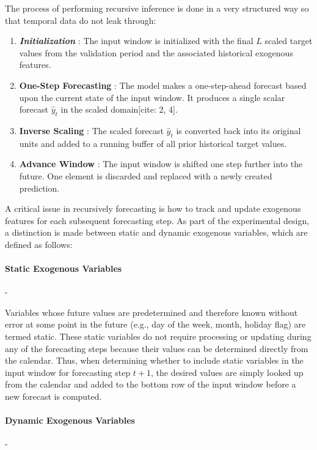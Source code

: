 The process of performing recursive inference is done in a very structured way so that temporal data do not leak through:
\begin{enumerate}
\item \textit{\textbf{Initialization}} : The input window is initialized with the final $L$ scaled target values from the validation period and the associated historical exogenous features.

\item \textbf{One-Step Forecasting} : The model makes a one-step-ahead forecast based upon the current state of the input window. It produces a single scalar forecast $\hat{y}_t$ in the scaled domain[cite: 2, 4].

\item \textbf{Inverse Scaling} : The scaled forecast $\hat{y}_t$ is converted back into its original units and added to a running buffer of all prior historical target values.

\item {\textbf{Advance Window}} : The input window is shifted one step further into the future. One element is discarded and replaced with a newly created prediction.
\end{enumerate}
A critical issue in recursively forecasting is how to track and update exogenous features for each subsequent forecasting step. As part of the experimental design, a distinction is made between static and dynamic exogenous variables, which are defined as follows:

\paragraph{Static Exogenous Variables} -

Variables whose future values are predetermined and therefore known without error at some point in the future (e.g., day of the week, month, holiday flag) are termed static. These static variables do not require processing or updating during any of the forecasting steps because their values can be determined directly from the calendar. Thus, when determining whether to include static variables in the input window for forecasting step $t + 1$, the desired values are simply looked up from the calendar and added to the bottom row of the input window before a new forecast is computed.

\paragraph{Dynamic Exogenous Variables} -

